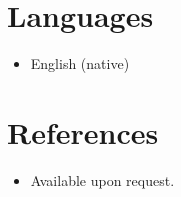 \documentclass[11pt,a4paper,sans]{moderncv}
\begin{document}

\section{Languages}
\vspace{1pt}
\begin{itemize}
\item English (native)
\end{itemize}


\section{References}
\vspace{1pt}
\begin{itemize}
\item{Available upon request.}
\end{itemize}
\end{document}
